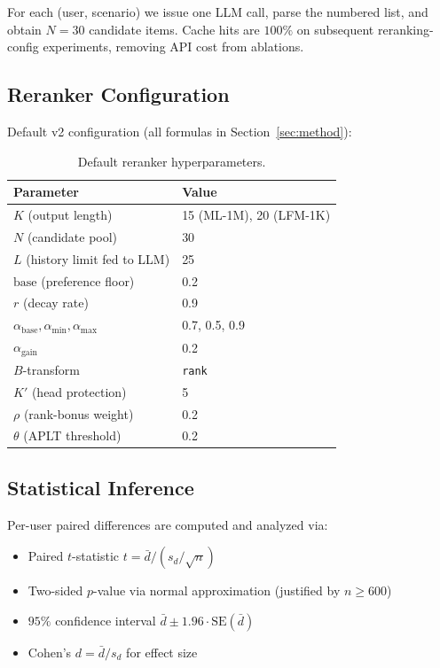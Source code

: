For each (user, scenario) we issue one LLM call, parse the numbered list, and obtain $N=30$ candidate items. Cache hits are $100\%$ on subsequent reranking-config experiments, removing API cost from ablations.

\subsection{Reranker Configuration}

Default v2 configuration (all formulas in Section~\ref{sec:method}):

\begin{table}[h]
\caption{Default reranker hyperparameters.}
\label{tab:hyperparams}
\begin{tabular}{ll}
\toprule
Parameter & Value \\
\midrule
$K$ (output length) & 15 (ML-1M), 20 (LFM-1K) \\
$N$ (candidate pool) & 30 \\
$L$ (history limit fed to LLM) & 25 \\
$\text{base}$ (preference floor) & 0.2 \\
$r$ (decay rate) & 0.9 \\
$\alpha_{\text{base}}, \alpha_{\min}, \alpha_{\max}$ & 0.7, 0.5, 0.9 \\
$\alpha_{\text{gain}}$ & 0.2 \\
$B$-transform & \texttt{rank} \\
$K'$ (head protection) & 5 \\
$\rho$ (rank-bonus weight) & 0.2 \\
$\theta$ (APLT threshold) & 0.2 \\
\bottomrule
\end{tabular}
\end{table}

\subsection{Statistical Inference}

Per-user paired differences are computed and analyzed via:
\begin{itemize}
\item Paired $t$-statistic $t = \bar{d} / (s_d / \sqrt{n})$
\item Two-sided $p$-value via normal approximation (justified by $n \geq 600$)
\item $95\%$ confidence interval $\bar{d} \pm 1.96 \cdot \text{SE}(\bar{d})$
\item Cohen's $d = \bar{d} / s_d$ for effect size
\end{itemize}

